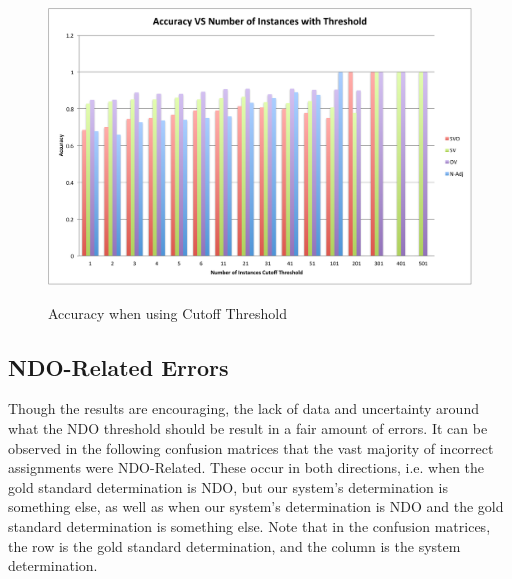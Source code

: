 \documentclass[]{aiaa-tc}
\begin{document}
\begin{figure}[H]
\caption{Accuracy when using Cutoff Threshold}
\hspace{-2mm} 
\includegraphics[width=\textwidth]{AccuracyVsNumberOfInstancesWithThreshold.pdf}
\label{fig:label}
\end{figure}

\subsection{NDO-Related Errors}
Though the results are encouraging, the lack of data and uncertainty around what the NDO threshold should be result in a fair amount of errors.  It can be observed in the following confusion matrices that the vast majority of incorrect assignments were NDO-Related.  These occur in both directions, i.e. when the gold standard determination is NDO, but our system's determination is something else, as well as when our system's determination is NDO and the gold standard determination is something else.  Note that in the confusion matrices, the row is the gold standard determination, and the column is the system determination.
\end{document}
